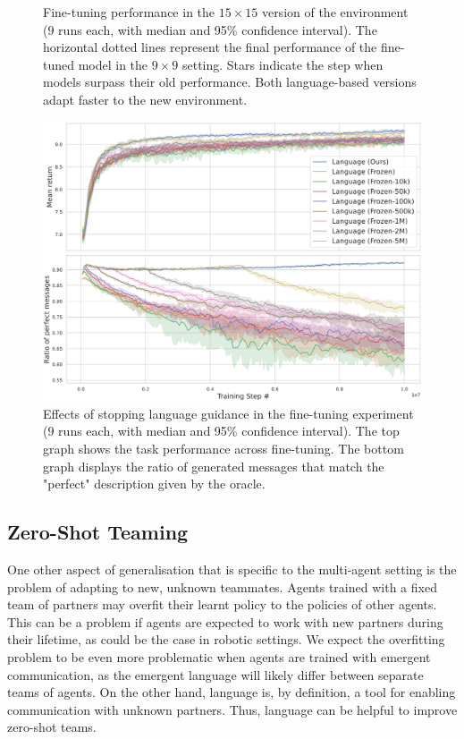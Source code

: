 \begin{figure}
    \centering
    
    \caption{Fine-tuning performance in the $15\times 15$ version of the environment (9 runs each, with median and 95\% confidence interval). The horizontal dotted lines represent the final performance of the fine-tuned model in the $9\times 9$ setting. Stars indicate the step when models surpass their old performance. Both language-based versions adapt faster to the new environment.}
    \label{fig:LAMAC:ad9_15}
\end{figure}

\begin{figure}
    \centering
    \includegraphics[width=\linewidth]{Figures/LAMAC/AdSA9_15_frzl.png}
    \caption{Effects of stopping language guidance in the fine-tuning experiment (9 runs each, with median and 95\% confidence interval). The top graph shows the task performance across fine-tuning. The bottom graph displays the ratio of generated messages that match the "perfect" description given by the oracle.}
    \label{fig:LAMAC:ad9_15_frzl}
\end{figure}



\subsection{Zero-Shot Teaming}\label{sec:LAMAC:Exp_ZST}

One other aspect of generalisation that is specific to the multi-agent setting is the problem of adapting to new, unknown teammates. Agents trained with a fixed team of partners may overfit their learnt policy to the policies of other agents. This can be a problem if agents are expected to work with new partners during their lifetime, as could be the case in robotic settings. We expect the overfitting problem to be even more problematic when agents are trained with emergent communication, as the emergent language will likely differ between separate teams of agents. On the other hand, language is, by definition, a tool for enabling communication with unknown partners. Thus, language can be helpful to improve zero-shot teams. 

